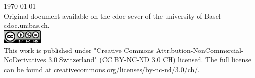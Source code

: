 \begin{titlepage}
\begin{center}

{\large \today\\[1cm]}
{\footnotesize Original document available on the edoc sever of the university of Basel edoc.unibas.ch.\\[0.5cm]
\includegraphics[height=7mm]{./inc/cclic}~\\[0.5cm]
This work is published under  "Creative Commons Attribution-NonCommercial-NoDerivatives 3.0 Switzerland" (CC BY-NC-ND 3.0 CH) licensed. The full license can be found at creativecommons.org/licenses/by-nc-nd/3.0/ch/.
}

\end{center}
\end{titlepage}

{\pagestyle{empty}
\pagecolor{orange}\afterpage{\nopagecolor}
}


